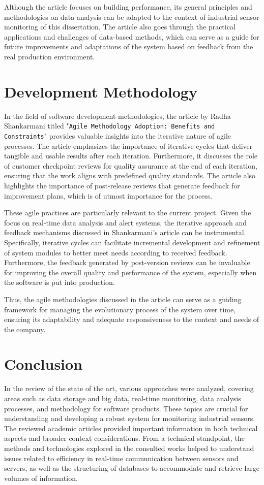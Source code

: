 Although the article focuses on building performance, its general principles and methodologies on data analysis can be adapted to the context of industrial sensor monitoring of this dissertation. The article also goes through the practical applications and challenges of data-based methods, which can serve as a guide for future improvements and adaptations of the system based on feedback from the real production environment.

\section{Development Methodology}
In the field of software development methodologies, the article by Radha Shankarmani titled "\texttt{Agile Methodology Adoption: Benefits and Constraints}" \cite{shankarmani2012agile} provides valuable insights into the iterative nature of agile processes. The article emphasizes the importance of iterative cycles that deliver tangible and usable results after each iteration. Furthermore, it discusses the role of customer checkpoint reviews for quality assurance at the end of each iteration, ensuring that the work aligns with predefined quality standards. The article also highlights the importance of post-release reviews that generate feedback for improvement plans, which is of utmost importance for the process.

These agile practices are particularly relevant to the current project. Given the focus on real-time data analysis and alert systems, the iterative approach and feedback mechanisms discussed in Shankarmani's article can be instrumental. Specifically, iterative cycles can facilitate incremental development and refinement of system modules to better meet needs according to received feedback. Furthermore, the feedback generated by post-version reviews can be invaluable for improving the overall quality and performance of the system, especially when the software is put into production.

Thus, the agile methodologies discussed in the article can serve as a guiding framework for managing the evolutionary process of the system over time, ensuring its adaptability and adequate responsiveness to the context and needs of the company.

\section{Conclusion}
In the review of the state of the art, various approaches were analyzed, covering areas such as data storage and big data, real-time monitoring, data analysis processes, and methodology for software products. These topics are crucial for understanding and developing a robust system for monitoring industrial sensors. The reviewed academic articles provided important information in both technical aspects and broader context considerations. From a technical standpoint, the methods and technologies explored in the consulted works helped to understand issues related to efficiency in real-time communication between sensors and servers, as well as the structuring of databases to accommodate and retrieve large volumes of information.

